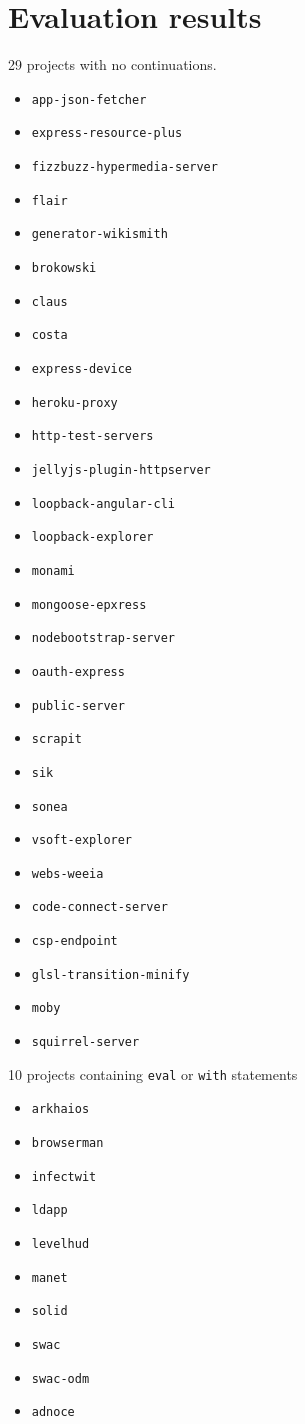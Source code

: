 \vfill\eject
\appendix

\section{Evaluation results} \label{section:results}

29 projects with no continuations.
\begin{itemize}
\item \texttt{app-json-fetcher}
\item \texttt{express-resource-plus}
\item \texttt{fizzbuzz-hypermedia-server}
\item \texttt{flair}
\item \texttt{generator-wikismith}
\item \texttt{brokowski}
\item \texttt{claus}
\item \texttt{costa}
\item \texttt{express-device}
\item \texttt{heroku-proxy}
\item \texttt{http-test-servers}
\item \texttt{jellyjs-plugin-httpserver}
\item \texttt{loopback-angular-cli}
\item \texttt{loopback-explorer}
\item \texttt{monami}
\item \texttt{mongoose-epxress}
\item \texttt{nodebootstrap-server}
\item \texttt{oauth-express}
\item \texttt{public-server}
\item \texttt{scrapit}
\item \texttt{sik}
\item \texttt{sonea}
\item \texttt{vsoft-explorer}
\item \texttt{webs-weeia}
\item \texttt{code-connect-server}
\item \texttt{csp-endpoint}
\item \texttt{glsl-transition-minify}
\item \texttt{moby}
\item \texttt{squirrel-server}
\end{itemize}

10 projects containing \texttt{eval} or \texttt{with} statements
\begin{itemize}
\item \texttt{arkhaios}
\item \texttt{browserman}
\item \texttt{infectwit}
\item \texttt{ldapp}
\item \texttt{levelhud}
\item \texttt{manet}
\item \texttt{solid}
\item \texttt{swac}
\item \texttt{swac-odm}
\item \texttt{adnoce}
\end{itemize}

